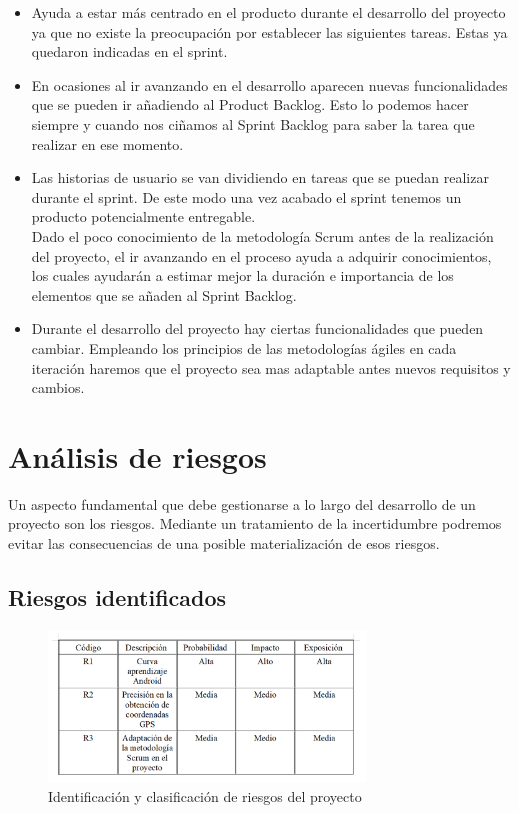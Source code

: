 \begin{itemize}
\item Ayuda a estar más centrado en el producto durante el desarrollo del proyecto ya que no existe la preocupación por establecer las siguientes tareas.  Estas ya quedaron indicadas en el sprint. 



\item En ocasiones al ir avanzando en el desarrollo aparecen nuevas funcionalidades que se pueden ir añadiendo al Product Backlog. Esto lo podemos hacer siempre y cuando nos ciñamos al Sprint Backlog
 para saber la tarea que realizar en ese momento.


\item  Las historias de usuario se van dividiendo en tareas que se puedan realizar durante el sprint. De este modo una vez acabado el sprint tenemos un producto potencialmente entregable.\\

Dado el poco conocimiento de la metodología Scrum antes de la realización del proyecto, el ir avanzando en el proceso ayuda a adquirir conocimientos, los cuales ayudarán a estimar mejor la duración e importancia de los elementos que se añaden al Sprint Backlog.


\item
Durante el desarrollo del proyecto hay ciertas funcionalidades que pueden cambiar. Empleando los principios de las metodologías ágiles en cada iteración haremos que el proyecto sea mas adaptable antes nuevos requisitos y cambios.

\end{itemize}


\section{Análisis de riesgos}

Un aspecto fundamental que debe gestionarse a lo largo del desarrollo de un proyecto
son los riesgos. Mediante un tratamiento de la incertidumbre podremos evitar
las consecuencias de una posible materialización de esos riesgos.
\subsection{Riesgos identificados}
\begin{figure}[H]
		\centering
		\includegraphics[width=0.75\textwidth] {riesgos.png}
		\caption{Identificación y clasificación de riesgos del proyecto }\label{fig:riesgos}
	\end{figure}
	
